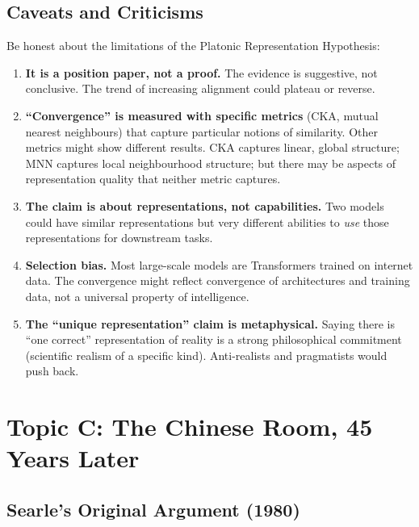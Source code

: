 \documentclass[11pt, a4paper]{article}
\begin{document}
\subsection{Caveats and Criticisms}

Be honest about the limitations of the Platonic Representation Hypothesis:

\begin{enumerate}[leftmargin=2em]
  \item \textbf{It is a position paper, not a proof.} The evidence is
    suggestive, not conclusive. The trend of increasing alignment could
    plateau or reverse.

  \item \textbf{``Convergence'' is measured with specific metrics} (CKA,
    mutual nearest neighbours) that capture particular notions of
    similarity. Other metrics might show different results. CKA captures
    linear, global structure; MNN captures local neighbourhood structure;
    but there may be aspects of representation quality that neither
    metric captures.

  \item \textbf{The claim is about representations, not capabilities.}
    Two models could have similar representations but very different
    abilities to \emph{use} those representations for downstream tasks.

  \item \textbf{Selection bias.} Most large-scale models are Transformers
    trained on internet data. The convergence might reflect convergence of
    architectures and training data, not a universal property of
    intelligence.

  \item \textbf{The ``unique representation'' claim is metaphysical.}
    Saying there is ``one correct'' representation of reality is a strong
    philosophical commitment (scientific realism of a specific kind).
    Anti-realists and pragmatists would push back.
\end{enumerate}


\section{Topic C: The Chinese Room, 45 Years Later}

\subsection{Searle's Original Argument (1980)}
\end{document}
